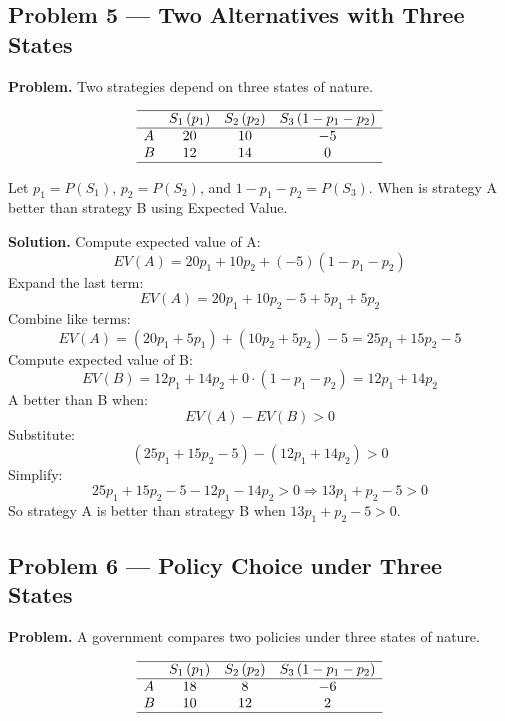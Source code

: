 \begin{ExamProblems}
		
		\hypertarget{c7-ex5}{}
		\item
		\subsection*{Problem 5 — Two Alternatives with Three States}
		
		\textbf{Problem.}
		Two strategies depend on three states of nature.
		
		\[
		\begin{array}{lccc}
			\hline
			& S_1\,(p_1) & S_2\,(p_2) & S_3\,(1-p_1-p_2) \\
			\hline
			A & 20 & 10 & -5 \\
			B & 12 & 14 & 0 \\
			\hline
		\end{array}
		\]
		
		Let \(p_1=P(S_1)\), \(p_2=P(S_2)\), and \(1-p_1-p_2=P(S_3)\).  
		When is strategy A better than strategy B using Expected Value.
		
		\textbf{Solution.}
		Compute expected value of A:
		\[
		EV(A)=20p_1 + 10p_2 + (-5)(1-p_1-p_2)
		\]
		Expand the last term:
		\[
		EV(A)=20p_1 + 10p_2 -5 + 5p_1 + 5p_2
		\]
		Combine like terms:
		\[
		EV(A)=(20p_1+5p_1) + (10p_2+5p_2) - 5 = 25p_1 + 15p_2 - 5
		\]
		Compute expected value of B:
		\[
		EV(B)=12p_1 + 14p_2 + 0\cdot(1-p_1-p_2)=12p_1+14p_2
		\]
		A better than B when:
		\[
		EV(A)-EV(B)>0
		\]
		Substitute:
		\[
		(25p_1+15p_2-5)-(12p_1+14p_2)>0
		\]
		Simplify:
		\[
		25p_1+15p_2-5-12p_1-14p_2>0
		\Rightarrow 13p_1+p_2-5>0
		\]
		So strategy A is better than strategy B when \(13p_1+p_2-5>0\).
		
		
		\hypertarget{c7-ex6}{}
		\item
		\subsection*{Problem 6 — Policy Choice under Three States}
		
		\textbf{Problem.}
		A government compares two policies under three states of nature.
		
		\[
		\begin{array}{lccc}
			\hline
			& S_1\,(p_1) & S_2\,(p_2) & S_3\,(1-p_1-p_2) \\
			\hline
			A & 18 & 8 & -6 \\
			B & 10 & 12 & 2 \\
			\hline
		\end{array}
		\]
		

\end{ExamProblems}
